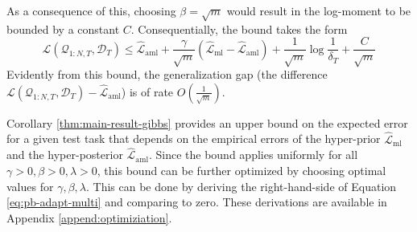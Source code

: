 \documentclass[letterpaper]{article} %
\theoremstyle{definition}
\begin{document}
As a consequence of this, choosing $\beta=\sqrt{m}$ would result 
in the log-moment to be bounded by a constant $C$. Consequentially, the bound takes the form
$$\mathcal{L}(\mathcal{Q}_{1:N,T}, \mathcal{D}_T) \leq \hat{\mathcal{L}}_{\mathrm{aml}} +
\frac{\gamma}{\sqrt{m}}(\hat{\mathcal{L}}_{\mathrm{ml}}-\hat{\mathcal{L}}_{\mathrm{aml}}) 
+\frac{1}{\sqrt{m}}\log\frac{1}{\delta_T}+\frac{C}{\sqrt{m}}$$
Evidently from this bound, the generalization gap (the difference $\mathcal{L}(\mathcal{Q}_{1:N,T}, \mathcal{D}_T)-\hat{\mathcal{L}}_{\mathrm{aml}}$) is of rate $O\left (\frac{1}{\sqrt{m}}\right )$.


Corollary \ref{thm:main-result-gibbs} provides an upper bound on the expected error for a given test task that depends on the empirical errors of the hyper-prior $\hat{\mathcal{L}}_{\mathrm{ml}}$ and the hyper-posterior $\hat{\mathcal{L}}_{\mathrm{aml}}$. 
Since the bound applies uniformly for all $\gamma>0,\beta>0,\lambda>0$, this bound can be further optimized by choosing optimal values for $\gamma, \beta, \lambda$. This can be done by deriving the right-hand-side of Equation \ref{eq:pb-adapt-multi} and comparing to zero. 
These derivations are available in Appendix \ref{append:optimiziation}. 

\end{document}
